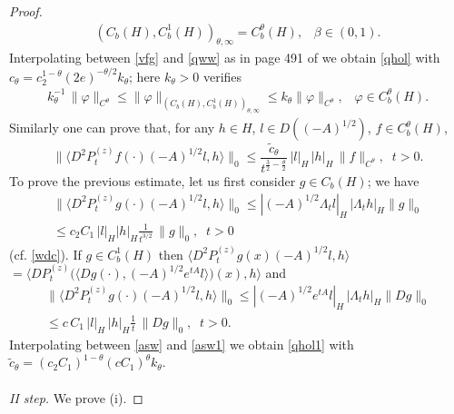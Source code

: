 \documentclass[preprint]{imsart}
\begin{document}
\begin{proof}
\begin{gather*}
 (C_b(H),C_b^1(H) )_{\theta,\infty} =C_b^{\theta}(H), \;\;\;  \beta\in(0,1).
\end{gather*}
Interpolating between \eqref{vfg} and \eqref{qww} as in page 491 of \cite{D2}   we obtain \eqref{qhol} with $c_{\theta} = c_2^{1 - \theta} (2e)^{-\theta /2 } k_{\theta}$; here $k_{\theta} >0$ verifies
\begin{gather*}
 {k_{\theta}^{-1}} \, \| \varphi \|_{C^{\theta}} \le  \| \varphi  \|_{(C_b(H),C_b^1(H) )_{\theta,\infty} } \le  k_{\theta}\| \varphi \|_{C^{\theta}},\;\;\; \varphi \in C_b^\theta(H).
\end{gather*}
Similarly one can prove that, for any $h \in H$, $l \in D((-A)^{1/2})$, $f \in C_b^{\theta}(H)$,
\begin{equation}\label{qhol1}
\| \langle  D^2 P_t^{(z)}  f (\cdot) (-A)^{1/2} l, h \rangle \|_0  \le  
\frac{\tilde c_{\theta}}{t^{\frac{3}{2} - \frac{\theta}{2}}} \, |  l|_H \,  |  h|_H \, \|f\|_{C^{\theta}},\;\; t>0.   
\end{equation}  
To prove the previous estimate, let us first consider  $g \in C_b(H)$; we have 
\begin{gather} \label{asw} 
\| \langle  D^2 P_t^{(z)}  g (\cdot) (-A)^{1/2} l, h \rangle \|_0  \le |(-A)^{1/2} \Lambda_t l |_H  \, | \Lambda_t h|_H \| g \|_0
\\ \nonumber 
\le c_2 C_1 \, |  l|_H  |  h|_H  \frac{1}{t^{3/2}}\, \| g \|_0
, \; \; t>0 
\end{gather}  
 (cf. \eqref{wdc}). 
 If $g \in C^1_b(H)$ then $\langle  D^2 P_t^{(z)}  g (x) (-A)^{1/2} l, h \rangle$
   $= \langle D P_t^{(z)} \big (\langle Dg(\cdot ) , (-A)^{1/2} e^{tA}  l \rangle \big) (x), h \rangle $ and 
 \begin{gather} \label{asw1}
\| \langle  D^2 P_t^{(z)}  g (\cdot) (-A)^{1/2} l, h \rangle \|_0  \le |(-A)^{1/2} e^{tA}l |_H  \, | \Lambda_t h|_H \| Dg \|_0
\\ \nonumber  
\le c \, C_1 \, |  l|_H \,  |  h|_H  \frac{1}{t}\,  \| Dg \|_0
, \; \; t>0.  
\end{gather} 
  Interpolating between \eqref{asw} and \eqref{asw1}    we obtain \eqref{qhol1} with $\tilde c_{\theta} = (c_2C_1)^{1 - \theta} (c C_1)^{\theta } k_{\theta}$.
 \\ \\
{\it II step.} We  prove (i).



\end{proof}
\end{document}

